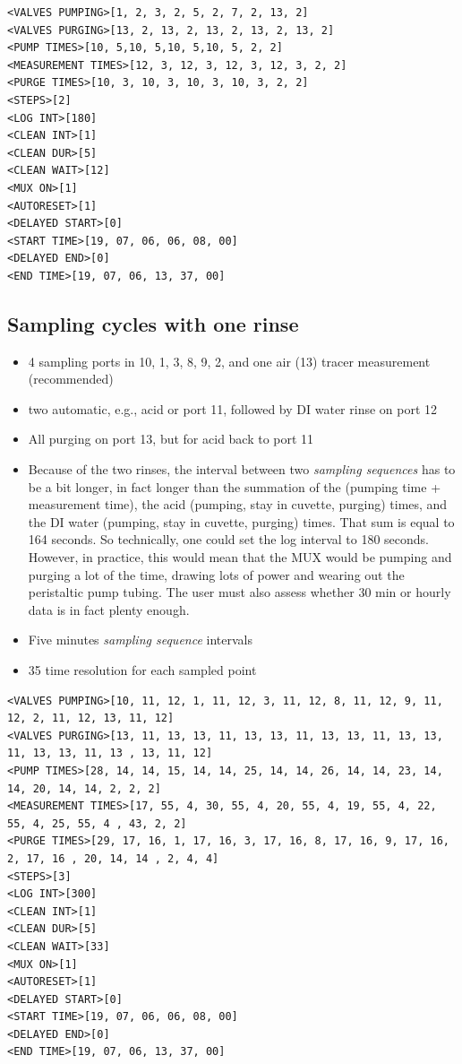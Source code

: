 \documentclass[]{book}
\providecommand{\tightlist}{%
  \setlength{\itemsep}{0pt}\setlength{\parskip}{0pt}}
\begin{document}
\begin{verbatim}
<VALVES PUMPING>[1, 2, 3, 2, 5, 2, 7, 2, 13, 2]
<VALVES PURGING>[13, 2, 13, 2, 13, 2, 13, 2, 13, 2]
<PUMP TIMES>[10, 5,10, 5,10, 5,10, 5, 2, 2]
<MEASUREMENT TIMES>[12, 3, 12, 3, 12, 3, 12, 3, 2, 2]
<PURGE TIMES>[10, 3, 10, 3, 10, 3, 10, 3, 2, 2]
<STEPS>[2]
<LOG INT>[180]
<CLEAN INT>[1]
<CLEAN DUR>[5]
<CLEAN WAIT>[12]
<MUX ON>[1]
<AUTORESET>[1]
<DELAYED START>[0]
<START TIME>[19, 07, 06, 06, 08, 00]
<DELAYED END>[0]
<END TIME>[19, 07, 06, 13, 37, 00]
\end{verbatim}

\hypertarget{sampling-cycles-with-one-rinse-2}{%
\subsection{Sampling cycles with one rinse}\label{sampling-cycles-with-one-rinse-2}}

\begin{itemize}
\tightlist
\item
  4 sampling ports in 10, 1, 3, 8, 9, 2, and one air (13) tracer measurement (recommended)
\item
  two automatic, e.g., acid or port 11, followed by DI water rinse on port 12
\item
  All purging on port 13, but for acid back to port 11
\item
  Because of the two rinses, the interval between two \emph{sampling sequences} has to be a bit longer, in fact longer than the summation of the (pumping time + measurement time), the acid (pumping, stay in cuvette, purging) times, and the DI water (pumping, stay in cuvette, purging) times. That sum is equal to 164 seconds. So technically, one could set the log interval to 180 seconds. However, in practice, this would mean that the MUX would be pumping and purging a lot of the time, drawing lots of power and wearing out the peristaltic pump tubing. The user must also assess whether 30 min or hourly data is in fact plenty enough.
\item
  Five minutes \emph{sampling sequence} intervals
\item
  35 time resolution for each sampled point
\end{itemize}

\begin{verbatim}
<VALVES PUMPING>[10, 11, 12, 1, 11, 12, 3, 11, 12, 8, 11, 12, 9, 11, 12, 2, 11, 12, 13, 11, 12]
<VALVES PURGING>[13, 11, 13, 13, 11, 13, 13, 11, 13, 13, 11, 13, 13, 11, 13, 13, 11, 13 , 13, 11, 12]
<PUMP TIMES>[28, 14, 14, 15, 14, 14, 25, 14, 14, 26, 14, 14, 23, 14, 14, 20, 14, 14, 2, 2, 2]
<MEASUREMENT TIMES>[17, 55, 4, 30, 55, 4, 20, 55, 4, 19, 55, 4, 22, 55, 4, 25, 55, 4 , 43, 2, 2]
<PURGE TIMES>[29, 17, 16, 1, 17, 16, 3, 17, 16, 8, 17, 16, 9, 17, 16, 2, 17, 16 , 20, 14, 14 , 2, 4, 4]
<STEPS>[3]
<LOG INT>[300]
<CLEAN INT>[1]
<CLEAN DUR>[5]
<CLEAN WAIT>[33]
<MUX ON>[1]
<AUTORESET>[1]
<DELAYED START>[0]
<START TIME>[19, 07, 06, 06, 08, 00]
<DELAYED END>[0]
<END TIME>[19, 07, 06, 13, 37, 00]
\end{verbatim}
\end{document}
